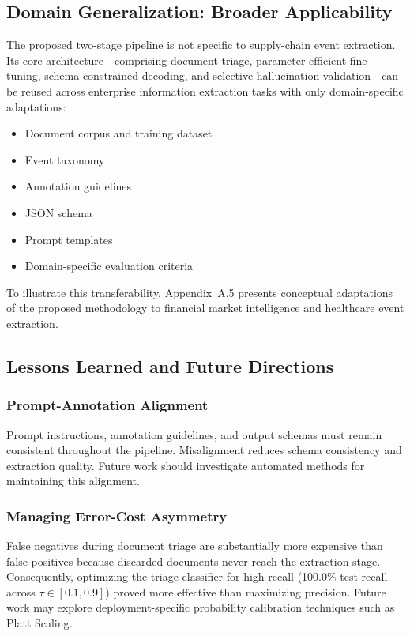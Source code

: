 \documentclass[11pt,a4paper]{article}
\begin{document}
\subsection{Domain Generalization: Broader Applicability}
The proposed two-stage pipeline is not specific to supply-chain event extraction. Its core architecture---comprising document triage, parameter-efficient fine-tuning, schema-constrained decoding, and selective hallucination validation---can be reused across enterprise information extraction tasks with only domain-specific adaptations:
\begin{itemize}[leftmargin=1.5em]
\item Document corpus and training dataset
\item Event taxonomy
\item Annotation guidelines
\item JSON schema
\item Prompt templates
\item Domain-specific evaluation criteria
\end{itemize}
To illustrate this transferability, Appendix~A.5 presents conceptual adaptations of the proposed methodology to financial market intelligence and healthcare event extraction.

\subsection{Lessons Learned and Future Directions}

\subsubsection{Prompt-Annotation Alignment}
Prompt instructions, annotation guidelines, and output schemas must remain consistent throughout the pipeline. Misalignment reduces schema consistency and extraction quality. Future work should investigate automated methods for maintaining this alignment.

\subsubsection{Managing Error-Cost Asymmetry}
False negatives during document triage are substantially more expensive than false positives because discarded documents never reach the extraction stage. Consequently, optimizing the triage classifier for high recall (100.0\% test recall across $\tau \in [0.1, 0.9]$) proved more effective than maximizing precision. Future work may explore deployment-specific probability calibration techniques such as Platt Scaling.
\end{document}
